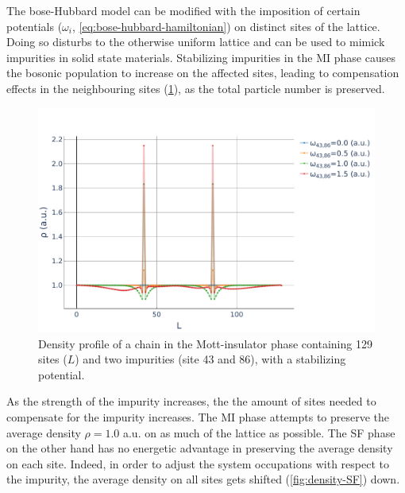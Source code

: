 \documentclass[twoside,twocolumn,9pt]{article}
\begin{document}
The bose-Hubbard model can be modified with the imposition of certain potentials ($\omega_i$, \cref{eq:bose-hubbard-hamiltonian}) on distinct sites of the lattice. Doing so disturbs to the otherwise uniform lattice and can be used to mimick impurities in solid state materials. Stabilizing impurities in the MI phase causes the bosonic population to increase on the affected sites, leading to compensation effects in the neighbouring sites (\cref{fig:density-MI}), as the total particle number is preserved.
\begin{center}
  \begin{figure}
      \includegraphics[width=\linewidth]{../code/figures/Density-profiles-MI.pdf}
      \caption{Density profile of a chain in the Mott-insulator phase containing 129 sites ($L$) and two impurities (site 43 and 86), with a stabilizing potential.}
      \label{fig:density-MI}
  \end{figure}
\end{center}
As the strength of the impurity increases, the the amount of sites needed to compensate for the impurity increases. The MI phase attempts to preserve the average density $\rho=1.0$ a.u. on as much of the lattice as possible. The SF phase on the other hand has no energetic advantage in preserving the average density on each site. Indeed, in order to adjust the system occupations with respect to the impurity, the average density on all sites gets shifted (\cref{fig:density-SF}) down.
\end{document}
